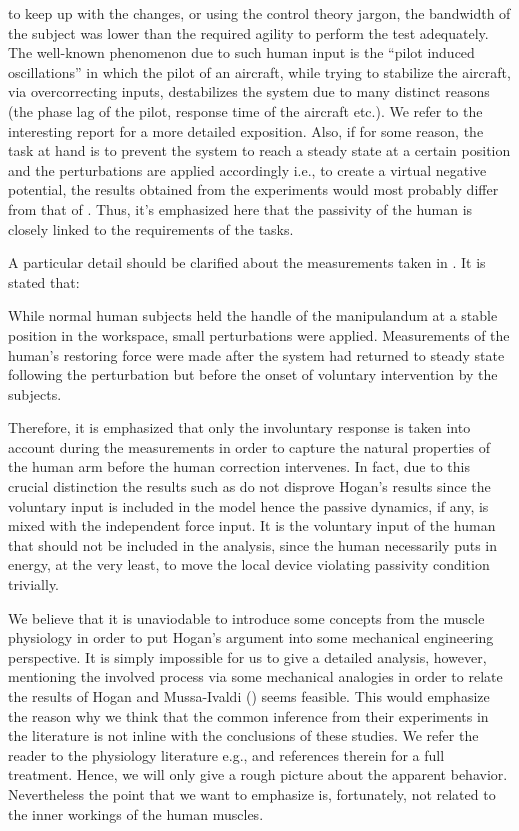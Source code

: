 to keep up with the changes, or using the control theory jargon, the bandwidth of the subject was lower than the required agility to 
perform the test adequately. The well-known phenomenon due to such human input is the \enquote{pilot induced oscillations} in which the 
pilot of an aircraft, while trying to stabilize the aircraft, via overcorrecting inputs, destabilizes the system due to many distinct 
reasons (the phase lag of the pilot, response time of the aircraft etc.). We refer to the interesting report \cite{mcruer} for a more 
detailed exposition. Also, if for some reason, the task at hand is to prevent the system to reach a steady state at a certain position 
and the perturbations are applied accordingly i.e., to create a virtual negative potential, the results obtained from the experiments 
would most probably differ from that of \cite{mussa85}. Thus, it's emphasized here that the passivity of the human is closely linked 
to the requirements of the tasks. 


\begin{rem}\label{rem:filament}
A particular detail should be clarified about the measurements taken in \cite{hogan89}. It is stated that: 
\begin{displayquote}
While normal human subjects held the handle of the manipulandum at a stable position
in the workspace, small perturbations were applied. Measurements
of the human's restoring force were made after the system
had returned to steady state following the perturbation but before
the onset of voluntary intervention by the subjects.
\end{displayquote}
Therefore, it is emphasized that only the involuntary response is taken into account during the measurements in order to
capture the natural properties of the human arm before the human correction intervenes. In fact, due to this crucial distinction
the results such as \cite{dyck2013} do not disprove Hogan's results since the voluntary input is included in the model hence the passive 
dynamics, if any, is mixed with the independent force input. It is the voluntary input of the human that should not be included in the 
analysis, since the human necessarily puts in energy, at the very least, to move the local device violating passivity condition trivially.
\end{rem}

We believe that it is unaviodable to introduce some concepts from the muscle physiology in order to put Hogan's 
argument into some mechanical engineering perspective. It is simply impossible for us to give a detailed analysis, 
however, mentioning the involved process via some mechanical analogies in order to relate the results of 
Hogan and Mussa-Ivaldi (\cite{mussa85}) seems feasible. This would emphasize the reason why we think that the common inference 
from their experiments in the literature is not inline with the conclusions of these studies. We refer the reader 
to the physiology literature e.g., \cite{spudich,millman,offer,horowits,yildiz,geeves} and references therein for a full 
treatment. Hence, we will only give a rough picture about the apparent behavior. Nevertheless the point that we want 
to emphasize is, fortunately, not related to the inner workings of the human muscles.

